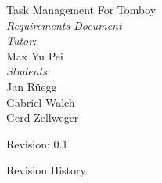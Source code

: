 \begin{titlepage}
\mbox{}
\vfill
\begin{center}
{\huge  Task Management For Tomboy\\ \smallskip}
{\LARGE  {\em Requirements Document}\\}
\bigskip
\bigskip
{\Large {\em Tutor:\\}} {\large{Max Yu Pei\\}}
\bigskip
\bigskip
{\Large {\em Students:\\}} {\large Jan Rüegg\\ Gabriel Walch\\ Gerd Zellweger\\}

\bigskip
\bigskip
{\large Revision: 0.1}
\end{center}
\vfill
\end{titlepage}

\begin{titlepage}
\newpage
\tableofcontents
\newpage
\end{titlepage}


\begin{titlepage}
\newpage
{\Large Revision History\\}

\begin{revision_table}
\end{revision_table}
\newpage
\end{titlepage}
